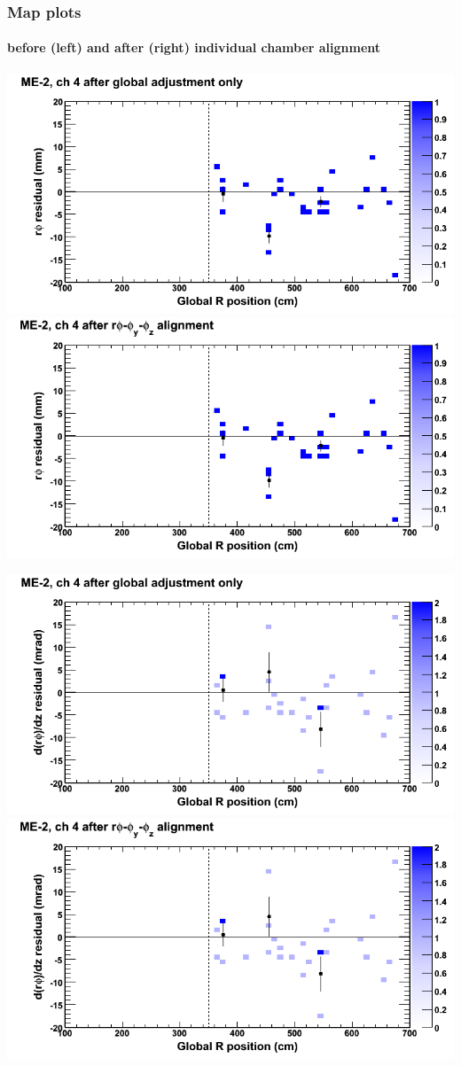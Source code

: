 \documentclass[compress]{beamer}
\begin{document}
\begin{frame}
\frametitle{Map plots}
\framesubtitle{before (left) and after (right) individual chamber alignment}
\includegraphics[width=0.5\linewidth]{ringmapplots_3dof/before_CSCvsr_mem2ch04_x.png} \includegraphics[width=0.5\linewidth]{ringmapplots_3dof/after_CSCvsr_mem2ch04_x.png}

\includegraphics[width=0.5\linewidth]{ringmapplots_3dof/before_CSCvsr_mem2ch04_dxdz.png} \includegraphics[width=0.5\linewidth]{ringmapplots_3dof/after_CSCvsr_mem2ch04_dxdz.png}
\end{frame}
\end{document}
